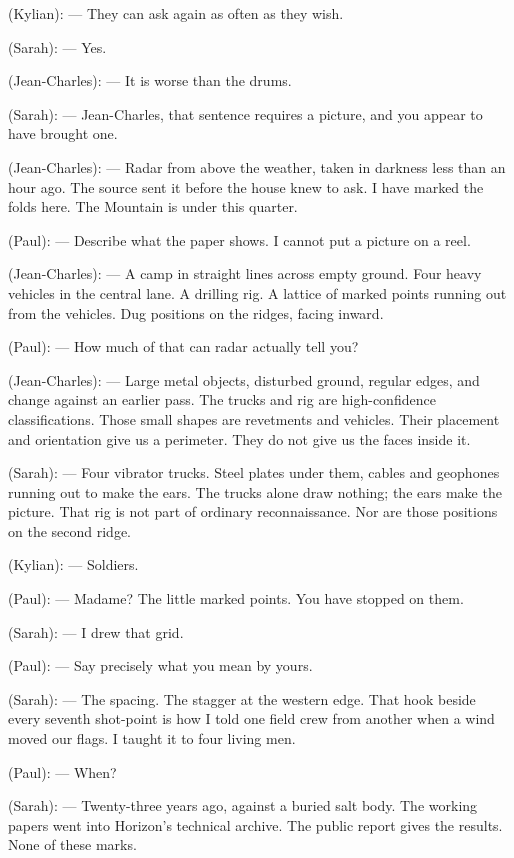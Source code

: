 \begin{room}
(Kylian): --- They can ask again as often as they wish.

(Sarah): --- Yes.

\centerline{}

(Jean-Charles): --- It is worse than the drums.

(Sarah): --- Jean-Charles, that sentence requires a picture, and you appear to have brought one.

(Jean-Charles): --- Radar from above the weather, taken in darkness less than an hour ago. The source sent it before the house knew to ask. I have marked the folds here. The Mountain is under this quarter.

(Paul): --- Describe what the paper shows. I cannot put a picture on a reel.

(Jean-Charles): --- A camp in straight lines across empty ground. Four heavy vehicles in the central lane. A drilling rig. A lattice of marked points running out from the vehicles. Dug positions on the ridges, facing inward.

(Paul): --- How much of that can radar actually tell you?

(Jean-Charles): --- Large metal objects, disturbed ground, regular edges, and change against an earlier pass. The trucks and rig are high-confidence classifications. Those small shapes are revetments and vehicles. Their placement and orientation give us a perimeter. They do not give us the faces inside it.

(Sarah): --- Four vibrator trucks. Steel plates under them, cables and geophones running out to make the ears. The trucks alone draw nothing; the ears make the picture. That rig is not part of ordinary reconnaissance. Nor are those positions on the second ridge.

(Kylian): --- Soldiers.

(Paul): --- Madame? The little marked points. You have stopped on them.

(Sarah): --- I drew that grid.

\centerline{}

(Paul): --- Say precisely what you mean by yours.

(Sarah): --- The spacing. The stagger at the western edge. That hook beside every seventh shot-point is how I told one field crew from another when a wind moved our flags. I taught it to four living men.

(Paul): --- When?

(Sarah): --- Twenty-three years ago, against a buried salt body. The working papers went into Horizon's technical archive. The public report gives the results. None of these marks.


\end{room}

